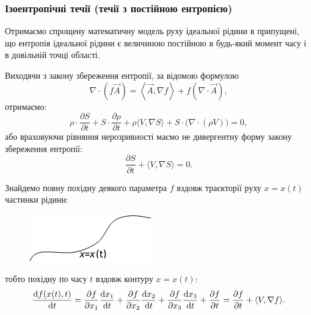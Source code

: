 % 


% 

% 



\subsubsection{Ізоентропічні течії (течії з постійною ентропією)}

Отримаємо спрощену математичну модель руху ідеальної рідини в припущені, що ентропія ідеальної рідини є величиною постійною в будь-який момент часу і в довільній точці області. \medskip

Виходячи з закону збереження ентропії, за відомою формулою
\begin{equation}
	\nabla \cdot \left( f \vec A \right) = \left\langle \vec A, \nabla f \right\rangle + f \left( \nabla \cdot \vec A \right),
\end{equation}
отримаємо:
\begin{equation}
	\rho \cdot \frac{\partial S}{\partial t} + S \cdot \frac{\partial \rho}{\partial t} + \rho \langle V, \nabla S \rangle + S \cdot \big( \nabla \cdot \left( \rho V \right) \big) = 0,
\end{equation}
або враховуючи рівняння нерозривності маємо не дивергентну форму закону збереження ентропії:
\begin{equation}
	\frac{\partial S}{\partial t} + \langle V, \nabla S \rangle = 0.
\end{equation}
	 
Знайдемо повну похідну деякого параметра $f$ вздовж траєкторії руху $x = x(t)$ частинки рідини:
\begin{figure}[H]
	\centering
	\includegraphics[]{img/11-1.png}
\end{figure}
тобто похідну по часу $t$ вздовж контуру $x = x(t)$:
\begin{equation}
	\frac{\diff f (x(t), t)}{\diff t} = \frac{\partial f}{\partial x_1} \frac{\diff x_1}{\diff t} + \frac{\partial f}{\partial x_2} \frac{\diff x_2}{\diff t} + \frac{\partial f}{\partial x_3} \frac{\diff x_3}{\diff t} + \frac{\partial f}{\partial t} = \frac{\partial f}{\partial t} + \langle V, \nabla f \rangle.
\end{equation}

